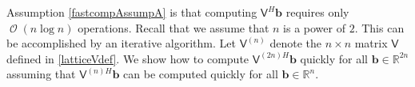 \documentclass{iitthesis}          %
\DeclareMathOperator{\Order}{{\mathcal O}}
\newcommand{\bm}[1]{\boldsymbol{#1}}
\newcommand{\reals}{\mathbb{R}}
\newcommand{\vtheta}{{\bm{\theta}}}
\newcommand{\vb}{\bm{b}}
\newcommand{\mP}{\mathsf{P}}
\newcommand{\mV}{\mathsf{V}}
\newcommand{\mW}{\mathsf{W}}
\begin{document}









\label{sec:iter_fft}
Assumption \eqref{fastcompAssumpA} is that computing $\mV^H \vb$ requires only $\Order(n \log n) $ operations.  Recall that we assume that $n$ is a power of $2$.  This can be accomplished by an iterative algorithm.  Let $\mV^{(n)}$ denote the $n \times n$ matrix $\mV$ defined in  \eqref{latticeVdef}.  We show how to compute $\mV^{(2n)H}\vb$ quickly for all $\vb \in \reals^{2n}$ assuming that $\mV^{(n)H}\vb$ can be computed quickly for all $\vb \in \reals^n$.
\end{document}
